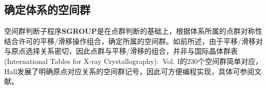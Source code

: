 \documentclass{article}      %
\newcommand{\upcite}[1]{\hspace{0ex}\textsuperscript{\cite{#1}}} %
\begin{document}
\subsection{确定体系的空间群}
空间群判断子程序\textbf{SGROUP}是在点群判断的基础上，根据体系所属的点群对称性结合许可的平移/滑移操作组合，确定所属的空间群。如前所述，由于平移/滑移对与原点选择关系密切，因此点群与平移/滑移的组合，并非与国际晶体群表\textrm{(International Tables for X-ray Crystallography):~Vol. I}\upcite{Henry-Lonsdale_1972}的230个空间群简单对应，\textrm{Hall}\upcite{ACA37-517_1981}发展了明确原点对应关系的空间群记号，因此可方便编程实现，具体可参阅文献\cite{ACA37-517_1981,ACA55-383_1999,ACA58-60_2002}。
\end{document}
